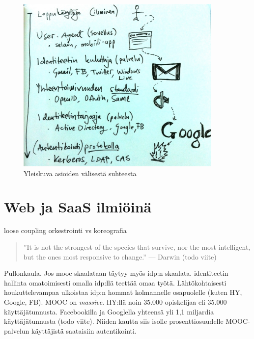 \documentclass[finnish,gradu]{tktltiki}
\begin{document}
  \begin{figure}
    \centering
    \includegraphics[width=0.9\textwidth]{images/auth_yleiskuva.jpg}
    \caption{Yleiskuva asioiden välisestä suhteesta}
    \label{fig:yleiskuva}
  \end{figure}



\section{Web ja SaaS ilmiöinä} %
\label{sec:web_ja_saas}


  loose coupling
  orkestrointi vs koreografia

  \begin{quote}
    ''It is not the strongest of the species that survive, nor the most intelligent, but the ones most responsive to change.'' --- Darwin (todo viite)
  \end{quote}

  Pullonkaula. Jos mooc skaalataan täytyy myös idp:n skaalata. identiteetin hallinta omatoimisesti omalla idp:llä teettää omaa työtä. Lähtökohtaisesti houkuttelevampaa ulkoistaa idp:n hommat kolmannelle osapuolelle (kuten HY, Google, FB). MOOC on \emph{massive}. HY:llä noin 35.000 opiskelijaa eli 35.000 käyttäjätunnusta. Facebookilla ja Googlella yhteensä yli 1,1 miljardia käyttäjätunnusta (todo viite). Niiden kautta siis isolle prosenttiosuudelle MOOC-palvelun käyttäjistä saataisiin autentikointi.
\end{document}
